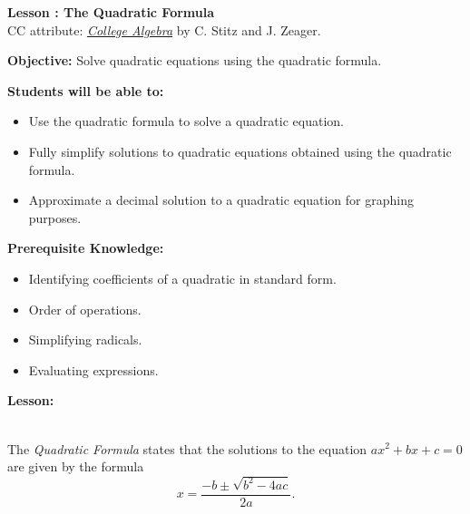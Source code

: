 \documentclass[12pt]{article}
\theoremstyle{definition}
\begin{document}
{\bf \large Lesson : The Quadratic Formula}
\\ CC attribute: \href{http://www.stitz-zeager.com}{\it{College Algebra}} by C. Stitz and J. Zeager. 
\hfill \doclicenseImage[imagewidth=5em]\\
\par
{\bf Objective:} Solve quadratic equations using the quadratic formula.\\
\par
{\bf Students will be able to:}
\begin{itemize}
	\item Use the quadratic formula to solve a quadratic equation.
	\item Fully simplify solutions to quadratic equations obtained using the quadratic formula.
	\item Approximate a decimal solution to a quadratic equation for graphing purposes.
\end{itemize}
{\bf Prerequisite Knowledge:}
\begin{itemize}
	\item Identifying coefficients of a quadratic in standard form.
	\item Order of operations.
	\item Simplifying radicals.
	\item Evaluating expressions.
\end{itemize}
\hrulefill

{\bf Lesson:}\\
\ \par
The {\it Quadratic Formula} states that the solutions to the equation $ax^2+bx+c=0$ are given by the formula
$$x=\dfrac{-b\pm\sqrt{b^2-4ac}}{2a}.$$
  
\end{document}
